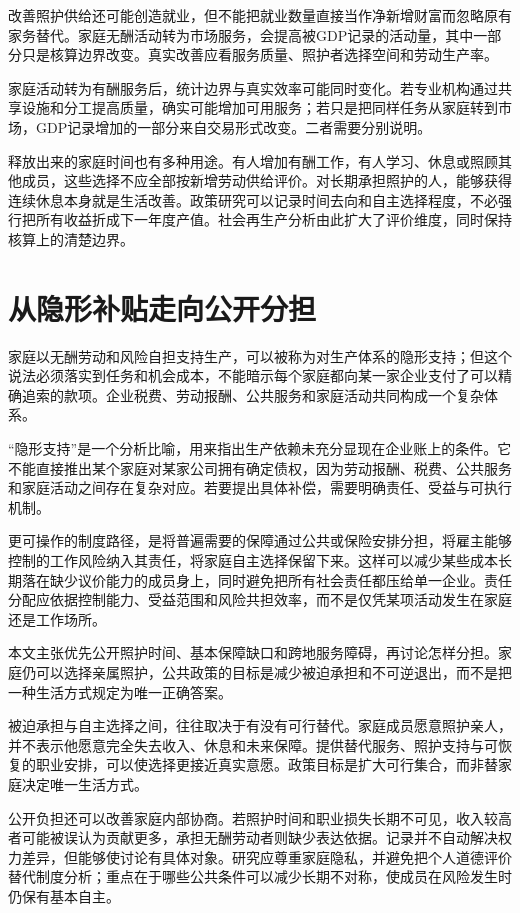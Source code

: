 \documentclass[UTF8,fontset=fandol,zihao=-4,oneside,openany]{ctexbook}
\begin{document}
改善照护供给还可能创造就业，但不能把就业数量直接当作净新增财富而忽略原有家务替代。家庭无酬活动转为市场服务，会提高被GDP记录的活动量，其中一部分只是核算边界改变。真实改善应看服务质量、照护者选择空间和劳动生产率。

\label{arg:P155}
家庭活动转为有酬服务后，统计边界与真实效率可能同时变化。若专业机构通过共享设施和分工提高质量，确实可能增加可用服务；若只是把同样任务从家庭转到市场，GDP记录增加的一部分来自交易形式改变。二者需要分别说明。

释放出来的家庭时间也有多种用途。有人增加有酬工作，有人学习、休息或照顾其他成员，这些选择不应全部按新增劳动供给评价。对长期承担照护的人，能够获得连续休息本身就是生活改善。政策研究可以记录时间去向和自主选择程度，不必强行把所有收益折成下一年度产值。社会再生产分析由此扩大了评价维度，同时保持核算上的清楚边界。

\section{从隐形补贴走向公开分担}
家庭以无酬劳动和风险自担支持生产，可以被称为对生产体系的隐形支持；但这个说法必须落实到任务和机会成本，不能暗示每个家庭都向某一家企业支付了可以精确追索的款项。企业税费、劳动报酬、公共服务和家庭活动共同构成一个复杂体系。

\label{arg:P156}
“隐形支持”是一个分析比喻，用来指出生产依赖未充分显现在企业账上的条件。它不能直接推出某个家庭对某家公司拥有确定债权，因为劳动报酬、税费、公共服务和家庭活动之间存在复杂对应。若要提出具体补偿，需要明确责任、受益与可执行机制。

更可操作的制度路径，是将普遍需要的保障通过公共或保险安排分担，将雇主能够控制的工作风险纳入其责任，将家庭自主选择保留下来。这样可以减少某些成本长期落在缺少议价能力的成员身上，同时避免把所有社会责任都压给单一企业。责任分配应依据控制能力、受益范围和风险共担效率，而不是仅凭某项活动发生在家庭还是工作场所。

本文主张优先公开照护时间、基本保障缺口和跨地服务障碍，再讨论怎样分担。家庭仍可以选择亲属照护，公共政策的目标是减少被迫承担和不可逆退出，而不是把一种生活方式规定为唯一正确答案。

\label{arg:P157}
被迫承担与自主选择之间，往往取决于有没有可行替代。家庭成员愿意照护亲人，并不表示他愿意完全失去收入、休息和未来保障。提供替代服务、照护支持与可恢复的职业安排，可以使选择更接近真实意愿。政策目标是扩大可行集合，而非替家庭决定唯一生活方式。

公开负担还可以改善家庭内部协商。若照护时间和职业损失长期不可见，收入较高者可能被误认为贡献更多，承担无酬劳动者则缺少表达依据。记录并不自动解决权力差异，但能够使讨论有具体对象。研究应尊重家庭隐私，并避免把个人道德评价替代制度分析；重点在于哪些公共条件可以减少长期不对称，使成员在风险发生时仍保有基本自主。
\end{document}
